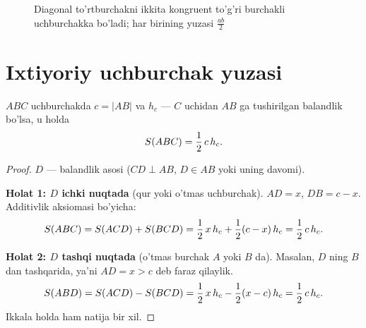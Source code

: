 \begin{figure}[h]
\centering
{}
\caption{Diagonal to'rtburchakni ikkita kongruent to'g'ri burchakli uchburchakka
         bo'ladi; har birining yuzasi $\tfrac{ab}{2}$}
\label{fig:righttri}
\end{figure}

\section{Ixtiyoriy uchburchak yuzasi}
\label{sec:tri}

\begin{teorema}
\label{thm:tri}
$ABC$ uchburchakda $c = |AB|$ va $h_c$ — $C$ uchidan $AB$ ga tushirilgan
balandlik bo'lsa, u holda
\[
  S\!\left(ABC\right) = \frac{1}{2}\,c\,h_c.
\]
\end{teorema}
\begin{proof}
$D$ — balandlik asosi ($CD \perp AB$, $D \in AB$ yoki uning davomi).

\textbf{Holat 1: $D$ ichki nuqtada} (qur yoki o'tmas uchburchak).
$AD = x$, $DB = c - x$.
Additivlik aksiomasi bo'yicha:
\[
  S\!\left(ABC\right) = S\!\left(ACD\right) + S\!\left(BCD\right)
    = \frac{1}{2}\,x\,h_c + \frac{1}{2}(c-x)\,h_c
    = \frac{1}{2}\,c\,h_c.
\]

\textbf{Holat 2: $D$ tashqi nuqtada} (o'tmas burchak $A$ yoki $B$ da).
Masalan, $D$ ning $B$ dan tashqarida, ya'ni $AD = x > c$ deb faraz qilaylik.
\[
  S\!\left(ABD\right) = S\!\left(ACD\right) - S\!\left(BCD\right)
    = \frac{1}{2}\,x\,h_c - \frac{1}{2}(x-c)\,h_c = \frac{1}{2}\,c\,h_c.
\]
Ikkala holda ham natija bir xil. \qedhere
\end{proof}

